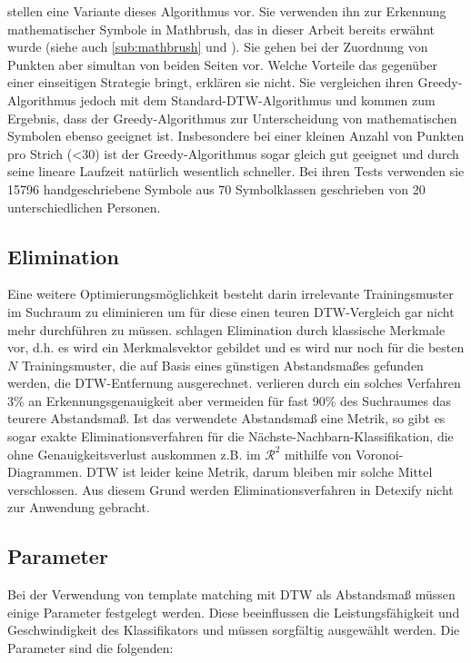 \citet{MacLean:2010p9970} stellen eine Variante dieses Algorithmus vor. Sie verwenden ihn zur Erkennung mathematischer Symbole in Mathbrush, das in dieser Arbeit bereits erwähnt wurde (siehe auch \ref{sub:mathbrush} und \cite{Labahn:2008p10301}). Sie gehen bei der Zuordnung von Punkten aber simultan von beiden Seiten vor.
Welche Vorteile das gegenüber einer einseitigen Strategie bringt, erklären sie nicht. Sie vergleichen ihren Greedy-Algorithmus jedoch mit dem Standard-DTW-Algorithmus und kommen zum Ergebnis, dass der Greedy-Algorithmus zur Unterscheidung von mathematischen Symbolen ebenso geeignet ist. Insbesondere bei einer kleinen Anzahl von Punkten pro Strich (<30) ist der Greedy-Algorithmus sogar gleich gut geeignet und durch seine lineare Laufzeit natürlich wesentlich schneller. Bei ihren Tests verwenden sie 15796 handgeschriebene Symbole aus 70 Symbolklassen geschrieben von 20 unterschiedlichen Personen.

\subsection{Elimination}
\label{sec:elimnimation}

Eine weitere Optimierungsmöglichkeit besteht darin irrelevante Trainingsmuster im Suchraum zu eliminieren um für diese einen teuren DTW-Vergleich gar nicht mehr durchführen zu müssen. \citet{Watt:2005p1816} schlagen Elimination durch klassische Merkmale vor, d.h. es wird ein Merkmalsvektor gebildet und es wird nur noch für die besten $N$ Trainingsmuster, die auf Basis eines günstigen Abstandsmaßes gefunden werden, die DTW-Entfernung ausgerechnet. \citet{Watt:2005p1816} verlieren durch ein solches Verfahren 3\% an Erkennungsgenauigkeit aber vermeiden für fast 90\% des Suchraumes das teurere Abstandsmaß.
Ist das verwendete Abstandsmaß eine Metrik, so gibt es sogar exakte Eliminationsverfahren für die Nächste-Nachbarn-Klassifikation, die ohne Genauigkeitsverlust auskommen z.B. im $\mathcal{R}^2$ mithilfe von Voronoi-Diagrammen. DTW ist leider keine Metrik, darum bleiben mir solche Mittel verschlossen.
Aus diesem Grund werden Eliminationsverfahren in Detexify nicht zur Anwendung gebracht.

\subsection{Parameter}
\label{sec:parameter}

Bei der Verwendung von template matching mit DTW als Abstandsmaß müssen einige Parameter festgelegt werden. Diese beeinflussen die Leistungsfähigkeit und Geschwindigkeit des Klassifikators und müssen sorgfältig ausgewählt werden. Die Parameter sind die folgenden:

